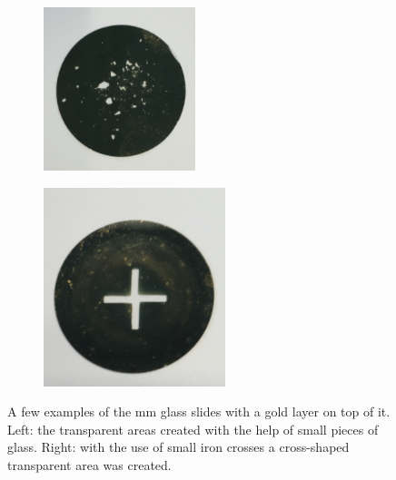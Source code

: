 \documentclass[twoside,single]{lion-msc}
\begin{document}
\begin{figure}
\begin{subfigure}{.5\textwidth}
  \centering
  \includegraphics[width=.7\linewidth]{glass}
  \label{cross}
\end{subfigure}%
\begin{subfigure}{.5\textwidth}
  \centering
  \includegraphics[width=.7\linewidth]{cross}
  \label{glass}
\end{subfigure}
\caption{A few examples of the  mm glass slides with a gold layer on top of it. Left: the transparent areas created with the help of small pieces of glass. Right: with the use of small iron crosses a cross-shaped transparent area was created.}
\label{gold_layer}
\end{figure}
\end{document}
